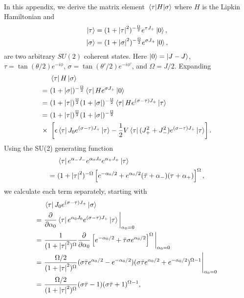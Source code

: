 \documentclass[Dual]{msu-thesis}
\begin{document}
\begin{appendices}
In this appendix, we derive the matrix element $\mel{\tau}{H}{\sigma}$ where $H$ is the Lipkin Hamiltonian and
\begin{align}
\ket{\tau}&=(1+\abs{\tau}^2)^{-\frac{\Omega}{2}}e^{\tau J_+}\ket{0},
\\
\ket{\sigma}&=(1+\abs{\sigma}^2)^{-\frac{\Omega}{2}}e^{\sigma J_+}\ket{0}
,\end{align}
are two arbitrary $SU(2)$ coherent states. Here $\ket{0}=\ket{J-J}$, $\tau=\tan(\theta/2)e^{-i\phi}$, $\sigma=\tan(\theta'/2)e^{-i\phi'}$, and $\Omega=J/2$. Expanding
\begin{align}
&\bra{\tau}H\ket{\sigma}
\\
= \ &
(1+\abs{\sigma})^{-\frac{\Omega}{2}}\bra{\tau}He^{\sigma J_+}\ket{0}
\\
= \ &
(1+\abs{\tau})^{\frac{\Omega}{2}}(1+\abs{\sigma})^{-\frac{\Omega}{2}}\bra{\tau}He^{(\sigma-\tau) J_+}\ket{\tau}
\\
= \ &
(1+\abs{\tau})^{\frac{\Omega}{2}}(1+\abs{\sigma})^{-\frac{\Omega}{2}}
\\
\times \ &
\left[\epsilon\bra{\tau}J_0e^{(\sigma-\tau) J_+}\ket{\tau}-\frac{1}{2}V\bra{\tau}(J^2_++J^2_-)e^{(\sigma-\tau) J_+}\ket{\tau}\right].
\end{align}
Using the SU(2) generating function
\begin{align}
&\bra{\tau}e^{\alpha_-J_-}e^{\alpha_0J_0}e^{\alpha_+J_+}\ket{\tau}
\\
= \ &
(1+\abs{\tau}^2)^{-\Omega}\left[e^{-\alpha_0/2}+e^{\alpha_0/2}(\bar{\tau}+\alpha_-)(\tau+\alpha_+)\right]^{\Omega},
\end{align}
we calculate each term separately, starting with
\begin{align}
&\bra{\tau}J_0e^{(\sigma-\tau) J_+}\ket{\sigma}
\nonumber
\\
= \ &
\frac{\partial}{\partial\alpha_0}\bra{\tau}e^{\alpha_0J_0}e^{(\sigma-\tau) J_+}\ket{\tau}\bigg{|}_{\alpha_0=0}
\nonumber
\\
= \ &
\frac{1}{(1+\abs{\tau}^2)^{\Omega}}\frac{\partial}{\partial\alpha_0}\left[e^{-\alpha_0/2}+\bar{\tau}\sigma e^{\alpha_0/2}\right]^{\Omega}\bigg{|}_{\alpha_0=0}
\nonumber
\\
= \ &
\frac{\Omega/2}{(1+\abs{\tau}^2)^{\Omega}}(\sigma\bar{\tau}e^{\alpha_0/2}-e^{-\alpha_0/2})(\sigma\bar{\tau}e^{\alpha_0/2}+e^{-\alpha_0/2})^{\Omega-1}\Bigg{|}_{\alpha_0=0}
\nonumber
\\
= \ &
\frac{\Omega/2}{(1+\abs{\tau}^2)^{\Omega}}(\sigma\bar{\tau}-1)(\sigma\bar{\tau}+1)^{\Omega-1},
\end{align}

\end{appendices}
\end{document}
